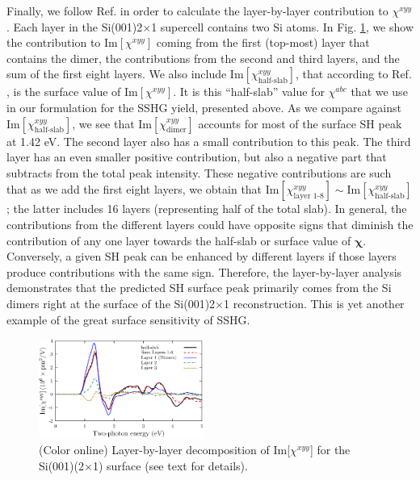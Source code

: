 \documentclass[aps,prb,10pt,showpacs,letterpaper,twocolumn]{revtex4-1}
\begin{document}
Finally, we follow Ref.  in order to calculate the
layer-by-layer contribution to $\chi^{xyy}$.  Each layer in the
Si(001)2$\times$1 supercell contains two Si atoms. In Fig. \ref{fig:fig8}, we
show the contribution to Im$[\chi^{xyy}]$ coming from the first (top-most) layer
that contains the dimer, the contributions from the second and third layers, and
the sum of the first eight layers. We also include
Im$[\chi^{xyy}_{\text{half-slab}}]$, that according to Ref.
, is the surface value of Im$[\chi^{xyy}]$. It is this
``half-slab'' value for $\chi^{abc}$ that we use in our formulation for the SSHG
yield, presented above. As we compare against
Im$[\chi^{xyy}_{\text{half-slab}}]$, we see that Im$[\chi^{xyy}_{\text{dimer}}]$
accounts for most of the surface SH peak at 1.42 eV. The second layer also has a
small contribution to this peak. The third layer has an even smaller positive
contribution, but also a negative part that subtracts from the total peak
intensity. These negative contributions are such that as we add the first eight
layers, we obtain that Im$[\chi^{xyy}_{\text{layer 1-8}}]\sim
\text{Im}[\chi^{xyy}_{\text{half-slab}}]$; the latter includes 16 layers
(representing half of the total slab). In general, the contributions from the
different layers could have opposite signs that diminish the contribution of any
one layer towards the half-slab or surface value of $\boldsymbol{\chi}$.
Conversely, a given SH peak can be enhanced by different layers if those layers
produce contributions with the same sign. Therefore, the layer-by-layer analysis
demonstrates that the predicted SH surface peak primarily comes from the Si
dimers right at the surface of the Si(001)2$\times$1 reconstruction. This is yet
another example of the great surface sensitivity of SSHG.

\begin{figure}[b]
\includegraphics[width=0.48\textwidth]{figures/fig8}
\caption{(Color online) Layer-by-layer decomposition of Im[$\chi^{xyy}$] for
the Si(001)(2$\times$1) surface (see text for details).}
\label{fig:fig8}
\end{figure}
\end{document}
